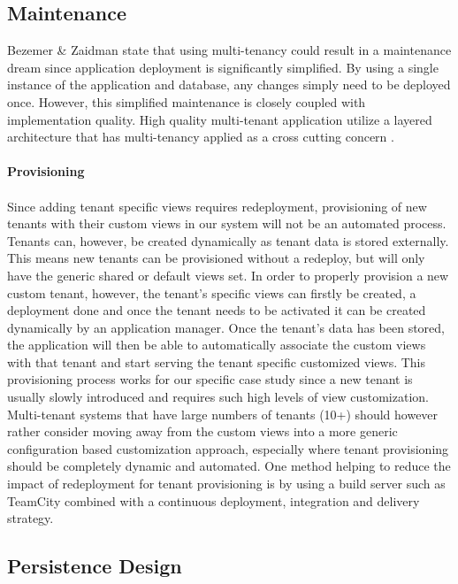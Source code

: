 \subsection{Maintenance}
\label{sec:maintainance}
Bezemer \& Zaidman \cite{Bezemer:2010:MSA:1862372.1862393} state that using multi-tenancy could result in a maintenance dream since application deployment is significantly simplified. By using a single instance of the application and database, any changes simply need to be deployed once. However, this simplified maintenance is closely coupled with implementation quality. High quality multi-tenant application utilize a layered architecture that has multi-tenancy applied as a cross cutting concern \cite{Bezemer:2010:MSA:1862372.1862393}.
\\
\\
\textbf{Provisioning}
\\
\\
Since adding tenant specific views requires redeployment, provisioning of new tenants with their custom views in our system will not be an automated process. Tenants can, however, be created dynamically as tenant data is stored externally. This means new tenants can be provisioned without a redeploy, but will only have the generic shared or default views set. In order to properly provision a new custom tenant, however, the tenant's specific views can firstly be created, a deployment done and once the tenant needs to be activated it can be created dynamically by an application manager. Once the tenant's data has been stored, the application will then be able to automatically associate the custom views with that tenant and start serving the tenant specific customized views. This provisioning process works for our specific case study since a new tenant is usually slowly introduced and requires such high levels of view customization. Multi-tenant systems that have large numbers of tenants (10+) should however rather consider moving away from the custom views into a more generic configuration based customization approach, especially where tenant provisioning should be completely dynamic and automated. One method helping to reduce the impact of redeployment for tenant provisioning is by using a build server such as TeamCity combined with a continuous deployment, integration and delivery strategy.


\subsection{Persistence Design}

